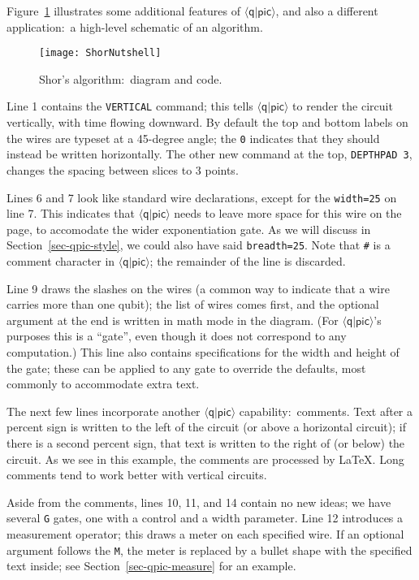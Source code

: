 \documentclass[twoside,12pt]{article}
\newcommand{\qpic}{$\langle\mathsf{q}|\mathsf{pic}\rangle$\xspace}
\begin{document}
Figure~\ref{fig-Shor} illustrates some additional features of \qpic, and
also a different application:\ a high-level schematic of an algorithm.


\begin{figure}[h!]
\begin{center}
\texttt{[image: ShorNutshell]}
\begin{minipage}{5.4in}

\end{minipage}
\end{center}
\caption{Shor's algorithm:\ diagram and code.}
\label{fig-Shor}
\end{figure}


Line 1 contains the {\tt VERTICAL} command; this tells \qpic to render the
circuit vertically, with time flowing downward.  By default the top and
bottom labels on the wires are typeset at a 45-degree angle; the {\tt 0}
indicates that they should instead be written horizontally.  The other
new command at the top, {\tt DEPTHPAD 3}, changes the spacing between
slices to 3 points.


Lines 6 and 7 look like standard wire declarations, except for the
{\tt width=25} on line 7.  This indicates that \qpic needs to leave more space
for this wire on the page, to accomodate the wider exponentiation gate.
As we will discuss in Section~\ref{sec-qpic-style}, we could also have said
{\tt breadth=25}.  Note that {\tt \#} is a comment
character in \qpic; the remainder of the line is discarded.


Line 9 draws the slashes on the wires (a common way to indicate that a
wire carries more than one qubit); the list of wires comes first, and the
optional argument at the end is written in math mode in the diagram.
(For \qpic's purposes this is a ``gate'', even though it does not
correspond to any computation.)  This line also contains specifications
for the width and height of the gate; these can be applied to any gate to
override the defaults, most commonly to accommodate extra text.


The next few lines incorporate another \qpic capability:\ comments.  Text after
a percent sign is written to the left of the circuit (or above a horizontal
circuit); if there is a second percent sign, that text is written to the
right of (or below) the circuit.  As we see in this example, the comments
are processed by \LaTeX.  Long comments tend to work better with
vertical circuits.


Aside from the comments, lines 10, 11, and 14 contain no new ideas; we
have several {\tt G} gates, one with a control and a width parameter.
Line 12 introduces a measurement operator; this draws a meter on each
specified wire.  If an optional argument follows the {\tt M}, the meter
is replaced by a bullet shape with the specified text inside; see
Section~\ref{sec-qpic-measure} for an example.
\end{document}
